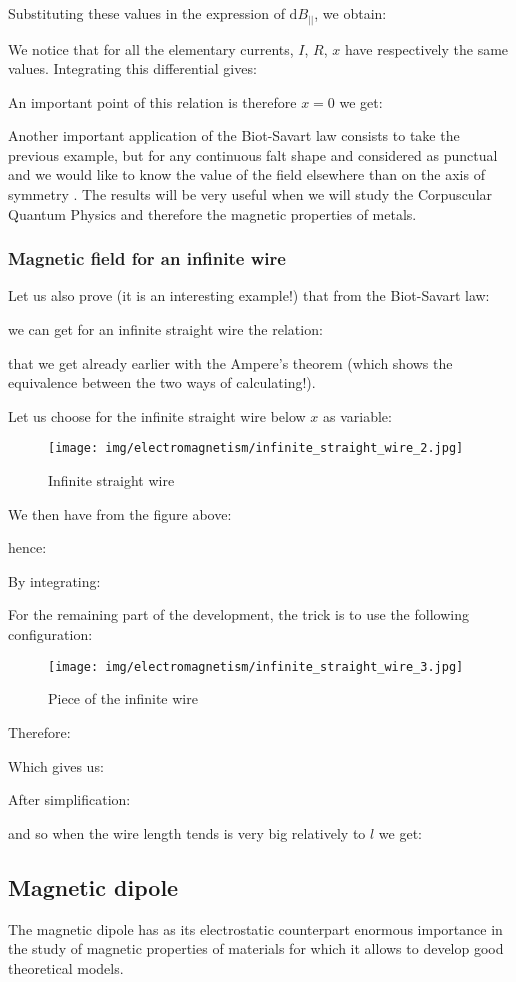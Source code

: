 	Substituting these values in the expression of $\mathrm{d}B_{||}$, we obtain:
	
	We notice that for all the elementary currents, $I$, $R$, $x$ have respectively the same values. Integrating this differential gives:
	
	An important point of this relation is therefore $x=0$ we get:
	
	Another important application of the Biot-Savart law consists to take the previous example, but for any continuous falt shape and considered as punctual and we would like to know the value of the field elsewhere than on the axis of symmetry . The results will be very useful when we will study the Corpuscular Quantum Physics and therefore the magnetic properties of metals.
	
	\subsubsection{Magnetic field for an infinite wire}
	Let us also prove (it is an interesting example!) that from the Biot-Savart law:
	
	we can get for an infinite straight wire the relation:
	
	that we get already earlier with the Ampere's theorem (which shows the equivalence between the two ways of calculating!).
	
	Let us choose for the infinite straight wire below $x$ as variable:
	\begin{figure}[H]
		\centering
		\texttt{[image: img/electromagnetism/infinite\_straight\_wire\_2.jpg]}
		\caption{Infinite straight wire}
	\end{figure}
	We then have from the figure above:
	
	hence:
	
	By integrating:
	
	For the remaining part of the development, the trick is to use the following configuration:
	\begin{figure}[H]
		\centering
		\texttt{[image: img/electromagnetism/infinite\_straight\_wire\_3.jpg]}
		\caption{Piece of the infinite wire}
	\end{figure}
	Therefore:
	
	Which gives us:
	
	After simplification:
	
	and so when the wire length tends is very big relatively to $l$ we get:
	
	
	\pagebreak
	\subsection{Magnetic dipole}
	The magnetic dipole has as its electrostatic counterpart enormous importance in the study of magnetic properties of materials for which it allows to develop good theoretical models.
	
